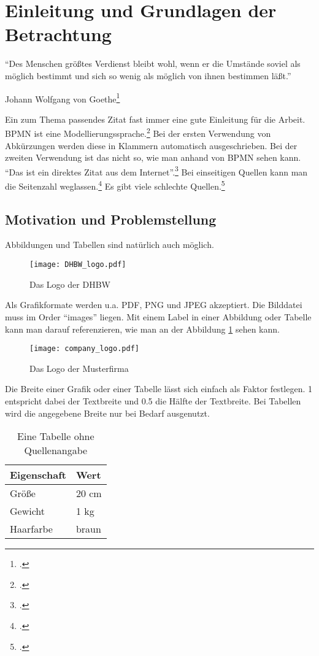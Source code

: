 \section{Einleitung und Grundlagen der Betrachtung}
\epigraph{"`Des Menschen größtes Verdienst bleibt wohl, wenn er die Umstände soviel als möglich bestimmt und sich so wenig als möglich von ihnen bestimmen läßt."'}{Johann Wolfgang von Goethe\footcite[S. 10]{Freund2014}}
Ein zum Thema passendes Zitat fast immer eine gute Einleitung für die Arbeit. 
\ac{BPMN} ist eine Modellierungssprache.\footcite[Vgl.][S. 1]{Freund2014} Bei der ersten Verwendung von Abkürzungen werden diese in Klammern automatisch ausgeschrieben. 
Bei der zweiten Verwendung ist das nicht so, wie man anhand von \ac{BPMN} sehen kann. "`Das ist ein direktes Zitat aus dem Internet"'.\footcite[S. 3]{OMG2018}
Bei einseitigen Quellen kann man die Seitenzahl weglassen.\footcite[Vgl.][]{schlechteQuelle}
Es gibt viele schlechte Quellen.\footcite[Vgl.][S. 1-3]{schlechteQuelle2}

\subsection{Motivation und Problemstellung}
Abbildungen und Tabellen sind natürlich auch möglich.

\begin{figure}[H]
  \centering
	\texttt{[image: DHBW\_logo.pdf]}
   \caption[Das Logo der DHBW]{Das Logo der DHBW\footnotemark}
\end{figure}

Als Grafikformate werden u.a. PDF, PNG und JPEG akzeptiert. Die Bilddatei muss im Order "`images"' liegen.
Mit einem Label in einer Abbildung oder Tabelle kann man darauf referenzieren, wie man an der Abbildung \ref{AbbildungLogoMusterfirma} sehen kann.
\begin{figure}[H]
  \centering
	\texttt{[image: company\_logo.pdf]}
   \caption[Das Logo der Musterfirma]{Das Logo der Musterfirma\protect\footnotemark}
   \label{AbbildungLogoMusterfirma}
\end{figure}

Die Breite einer Grafik oder einer Tabelle lässt sich einfach als Faktor festlegen. 1 entspricht dabei der Textbreite und 0.5 die Hälfte der Textbreite.
Bei Tabellen wird die angegebene Breite nur bei Bedarf ausgenutzt.

\begin{table}[H]
  \centering
  \begin{tabulary}{0.7\textwidth}{|L|L|}
  \hline 
  Eigenschaft & Wert \\ 
  \hline 
  Größe & 20 cm \\ 
  \hline 
  Gewicht & 1 kg \\
  \hline
  Haarfarbe & braun \\  
  \hline 
  \end{tabulary} 
  \caption[Eine Tabelle ohne Quellenangabe]{Eine Tabelle ohne Quellenangabe}
\end{table}


